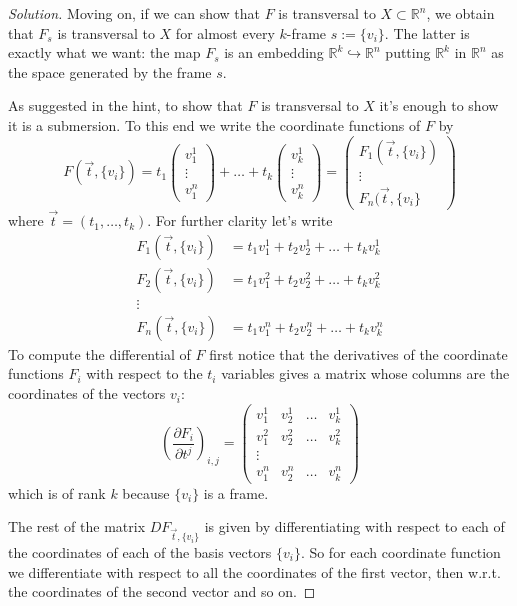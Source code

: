 \begin{proof}[Solution]
Moving on, if we can show that \(F\) is transversal to \(X \subset \mathbb{R}^n\), we obtain that \(F_s\) is transversal to \(X\) for almost every \(k\)-frame \(s:=\{v_i\}\). The latter is exactly what we want: the map \(F_s\) is an  embedding \(\mathbb{R}^k \hookrightarrow \mathbb{R}^n\) putting \(\mathbb{R}^k\) in \(\mathbb{R}^n\) as the space generated by the frame \(s\). 

As suggested in the hint, to show that \(F\) is transversal to \(X\) it's enough to show it is a submersion. To this end we write the coordinate functions of \(F\) by
\[F(\vec{t},\{v_i\})=t_1 \begin{pmatrix} v_1^1\\ \vdots \\ v^n_1 \end{pmatrix} + \ldots +t_k \begin{pmatrix} v_k^1\\ \vdots \\ v^n_k \end{pmatrix} = \begin{pmatrix} F_1(\vec{t}, \{v_i\})\\ \vdots  \\ F_n(\vec{t},\{v_i\} \end{pmatrix} \]
where \(\vec{t}=(t_1,\ldots,t_k)\). For further clarity let's write
\begin{align*}
F_1(\vec{t},\{v_i\})&=t_1v_1^1+t_2v_2^1+\ldots+t_kv_k^1\\
F_2(\vec{t},\{v_i\})&=t_1v_1^2+t_2v_2^2+\ldots+t_kv_k^2\\
\vdots \\
F_n(\vec{t},\{v_i\})&=t_1v_1^n+t_2v_2^n+\ldots+t_kv_k^n
\end{align*}
To compute the differential of \(F\) first notice that the derivatives of the coordinate functions \(F_i\) with respect to the \(t_i\) variables gives a matrix whose columns are the coordinates of the vectors \(v_i\):
\[\left(\frac{\partial F_i}{\partial t^j}\right)_{i,j} =\begin{pmatrix} v_1^1 & v_2^1 & \ldots & v_k^1\\ v_1^2 & v_2^2 & \ldots & v_k^2\\
\vdots \\
v_1^n & v_2^n & \ldots & v_k^n\end{pmatrix} \]
which is of rank \(k\) because \(\{v_i\}\) is a frame.

The rest of the matrix \(DF_{\vec{t},\{v_i\}}\) is given by differentiating with respect to each of the coordinates of each of the basis vectors \(\{v_i\}\). So for each coordinate function we differentiate with respect to all the coordinates of the first vector, then w.r.t. the coordinates of the second vector and so on.


\end{proof}
